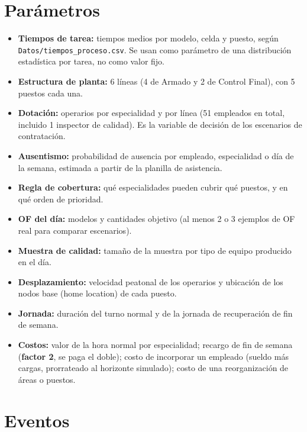 \documentclass[11pt,a4paper]{article}
\begin{document}
\section{Parámetros}

\begin{itemize}
  \item \textbf{Tiempos de tarea:} tiempos medios por modelo, celda y puesto, según \texttt{Datos/\allowbreak{}tiempos\_\allowbreak{}proceso.csv}. Se usan como parámetro de una distribución estadística por tarea, no como valor fijo.
  \item \textbf{Estructura de planta:} 6 líneas (4 de Armado y 2 de Control Final), con 5 puestos cada una.
  \item \textbf{Dotación:} operarios por especialidad y por línea (51 empleados en total, incluido 1 inspector de calidad). Es la variable de decisión de los escenarios de contratación.
  \item \textbf{Ausentismo:} probabilidad de ausencia por empleado, especialidad o día de la semana, estimada a partir de la planilla de asistencia.
  \item \textbf{Regla de cobertura:} qué especialidades pueden cubrir qué puestos, y en qué orden de prioridad.
  \item \textbf{OF del día:} modelos y cantidades objetivo (al menos 2 o 3 ejemplos de OF real para comparar escenarios).
  \item \textbf{Muestra de calidad:} tamaño de la muestra por tipo de equipo producido en el día.
  \item \textbf{Desplazamiento:} velocidad peatonal de los operarios y ubicación de los nodos base (home location) de cada puesto.
  \item \textbf{Jornada:} duración del turno normal y de la jornada de recuperación de fin de semana.
  \item \textbf{Costos:} valor de la hora normal por especialidad; recargo de fin de semana (\textbf{factor 2}, se paga el doble); costo de incorporar un empleado (sueldo más cargas, prorrateado al horizonte simulado); costo de una reorganización de áreas o puestos.
\end{itemize}

\section{Eventos}
\end{document}
